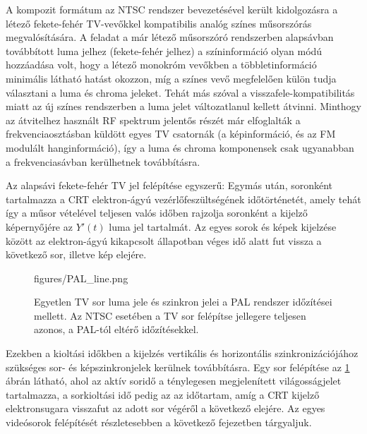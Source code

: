 A kompozit formátum az NTSC rendszer bevezetésével került kidolgozásra a létező fekete-fehér TV-vevőkkel kompatibilis analóg színes műsorszórás megvalósítására.
A feladat a már létező műsorszóró rendszerben alapsávban továbbított luma jelhez (fekete-fehér jelhez) a színinformáció olyan módú hozzáadása volt, hogy a létező monokróm vevőkben a többletinformáció minimális látható hatást okozzon, míg a színes vevő megfelelően külön tudja választani a luma és chroma jeleket.
Tehát más szóval a visszafele-kompatibilitás miatt az új színes rendszerben a luma jelet változatlanul kellett átvinni. 
Minthogy az átvitelhez használt RF spektrum jelentős részét már elfoglalták a frekvenciaosztásban küldött egyes TV csatornák (a képinformáció, és az FM modulált hanginformáció), így a luma és chroma komponensek csak ugyanabban a frekvenciasávban kerülhetnek továbbításra.

Az alapsávi fekete-fehér TV jel felépítése egyszerű:
Egymás után, soronként tartalmazza a CRT elektron-ágyú vezérlőfeszültségének időtörténetét, amely tehát így a műsor vételével teljesen valós időben rajzolja soronként a kijelző képernyőjére az $Y'(t)$ luma jel tartalmát.
Az egyes sorok és képek kijelzése között az elektron-ágyú kikapcsolt állapotban véges idő alatt fut vissza a következő sor, illetve kép elejére. 
%
\begin{figure}[]
	\centering
	\begin{minipage}[c]{0.65\textwidth}
	\begin{overpic}[width = 0.95\columnwidth ]{figures/PAL_line.png}
	\end{overpic} \end{minipage}\hfill
	\begin{minipage}[c]{0.35\textwidth}	\caption{Egyetlen TV sor luma jele és szinkron jelei a PAL rendszer időzítései mellett. Az NTSC esetében a TV sor felépítse jellegere teljesen azonos, a PAL-tól eltérő időzítésekkel.}
	\label{Fig:PAL_line}  \end{minipage}
\end{figure}
%
Ezekben a kioltási időkben a kijelzés vertikális és horizontális szinkronizációjához szükséges sor- és képszinkronjelek kerülnek továbbításra. 
Egy sor felépítése az \ref{Fig:PAL_line} ábrán látható, ahol az aktív soridő a ténylegesen megjelenített világosságjelet tartalmazza, a sorkioltási idő pedig az az időtartam, amíg a CRT kijelző elektronsugara visszafut az adott sor végéről a következő elejére.
Az egyes videósorok felépítését részletesebben a következő fejezetben tárgyaljuk.

